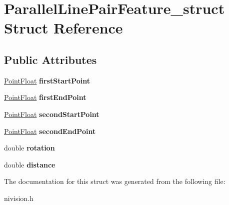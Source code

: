 \hypertarget{structParallelLinePairFeature__struct}{\section{\-Parallel\-Line\-Pair\-Feature\-\_\-struct \-Struct \-Reference}
\label{structParallelLinePairFeature__struct}
}
\subsection*{\-Public \-Attributes}
\begin{DoxyCompactItemize}
\item 
\hypertarget{structParallelLinePairFeature__struct_a6d8dd34b5b675563f4f2e4f9911769d8}{\hyperlink{structPointFloat__struct}{\-Point\-Float} {\bfseries first\-Start\-Point}}\label{structParallelLinePairFeature__struct_a6d8dd34b5b675563f4f2e4f9911769d8}

\item 
\hypertarget{structParallelLinePairFeature__struct_a6f2ded74cab270909e7138b3b23da21e}{\hyperlink{structPointFloat__struct}{\-Point\-Float} {\bfseries first\-End\-Point}}\label{structParallelLinePairFeature__struct_a6f2ded74cab270909e7138b3b23da21e}

\item 
\hypertarget{structParallelLinePairFeature__struct_ac6cb3ecd1adb9b7972bfe750cfaf0ccb}{\hyperlink{structPointFloat__struct}{\-Point\-Float} {\bfseries second\-Start\-Point}}\label{structParallelLinePairFeature__struct_ac6cb3ecd1adb9b7972bfe750cfaf0ccb}

\item 
\hypertarget{structParallelLinePairFeature__struct_add08226e9b3cad3938ef6ebf8fb46fb7}{\hyperlink{structPointFloat__struct}{\-Point\-Float} {\bfseries second\-End\-Point}}\label{structParallelLinePairFeature__struct_add08226e9b3cad3938ef6ebf8fb46fb7}

\item 
\hypertarget{structParallelLinePairFeature__struct_addc9c2a4f6e9ab97ccb7d1c99cb10b98}{double {\bfseries rotation}}\label{structParallelLinePairFeature__struct_addc9c2a4f6e9ab97ccb7d1c99cb10b98}

\item 
\hypertarget{structParallelLinePairFeature__struct_aaa2d418ffacb9fd5ffc56badd6a28709}{double {\bfseries distance}}\label{structParallelLinePairFeature__struct_aaa2d418ffacb9fd5ffc56badd6a28709}

\end{DoxyCompactItemize}


\-The documentation for this struct was generated from the following file\-:\begin{DoxyCompactItemize}
\item 
nivision.\-h\end{DoxyCompactItemize}
